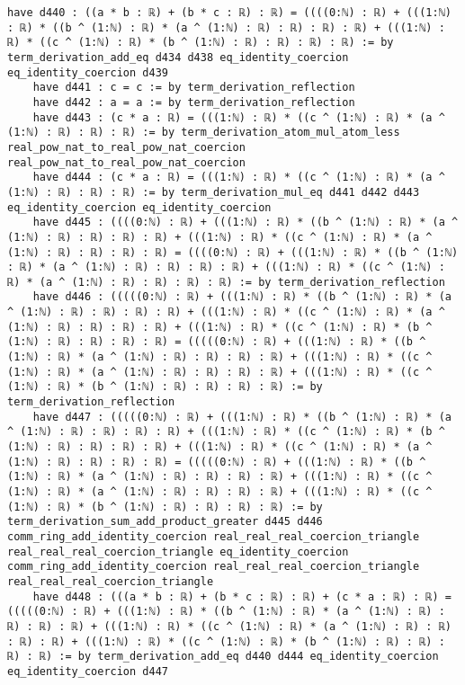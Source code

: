 \documentclass{article}
\begin{document}
\begin{tcolorbox}[colback=white!10, width=\linewidth]
\begin{lstlisting}[language=Lean4]
    have d440 : ((a * b : ℝ) + (b * c : ℝ) : ℝ) = ((((0:ℕ) : ℝ) + (((1:ℕ) : ℝ) * ((b ^ (1:ℕ) : ℝ) * (a ^ (1:ℕ) : ℝ) : ℝ) : ℝ) : ℝ) + (((1:ℕ) : ℝ) * ((c ^ (1:ℕ) : ℝ) * (b ^ (1:ℕ) : ℝ) : ℝ) : ℝ) : ℝ) := by term_derivation_add_eq d434 d438 eq_identity_coercion eq_identity_coercion d439
    have d441 : c = c := by term_derivation_reflection
    have d442 : a = a := by term_derivation_reflection
    have d443 : (c * a : ℝ) = (((1:ℕ) : ℝ) * ((c ^ (1:ℕ) : ℝ) * (a ^ (1:ℕ) : ℝ) : ℝ) : ℝ) := by term_derivation_atom_mul_atom_less real_pow_nat_to_real_pow_nat_coercion real_pow_nat_to_real_pow_nat_coercion
    have d444 : (c * a : ℝ) = (((1:ℕ) : ℝ) * ((c ^ (1:ℕ) : ℝ) * (a ^ (1:ℕ) : ℝ) : ℝ) : ℝ) := by term_derivation_mul_eq d441 d442 d443 eq_identity_coercion eq_identity_coercion
    have d445 : ((((0:ℕ) : ℝ) + (((1:ℕ) : ℝ) * ((b ^ (1:ℕ) : ℝ) * (a ^ (1:ℕ) : ℝ) : ℝ) : ℝ) : ℝ) + (((1:ℕ) : ℝ) * ((c ^ (1:ℕ) : ℝ) * (a ^ (1:ℕ) : ℝ) : ℝ) : ℝ) : ℝ) = ((((0:ℕ) : ℝ) + (((1:ℕ) : ℝ) * ((b ^ (1:ℕ) : ℝ) * (a ^ (1:ℕ) : ℝ) : ℝ) : ℝ) : ℝ) + (((1:ℕ) : ℝ) * ((c ^ (1:ℕ) : ℝ) * (a ^ (1:ℕ) : ℝ) : ℝ) : ℝ) : ℝ) := by term_derivation_reflection
    have d446 : (((((0:ℕ) : ℝ) + (((1:ℕ) : ℝ) * ((b ^ (1:ℕ) : ℝ) * (a ^ (1:ℕ) : ℝ) : ℝ) : ℝ) : ℝ) + (((1:ℕ) : ℝ) * ((c ^ (1:ℕ) : ℝ) * (a ^ (1:ℕ) : ℝ) : ℝ) : ℝ) : ℝ) + (((1:ℕ) : ℝ) * ((c ^ (1:ℕ) : ℝ) * (b ^ (1:ℕ) : ℝ) : ℝ) : ℝ) : ℝ) = (((((0:ℕ) : ℝ) + (((1:ℕ) : ℝ) * ((b ^ (1:ℕ) : ℝ) * (a ^ (1:ℕ) : ℝ) : ℝ) : ℝ) : ℝ) + (((1:ℕ) : ℝ) * ((c ^ (1:ℕ) : ℝ) * (a ^ (1:ℕ) : ℝ) : ℝ) : ℝ) : ℝ) + (((1:ℕ) : ℝ) * ((c ^ (1:ℕ) : ℝ) * (b ^ (1:ℕ) : ℝ) : ℝ) : ℝ) : ℝ) := by term_derivation_reflection
    have d447 : (((((0:ℕ) : ℝ) + (((1:ℕ) : ℝ) * ((b ^ (1:ℕ) : ℝ) * (a ^ (1:ℕ) : ℝ) : ℝ) : ℝ) : ℝ) + (((1:ℕ) : ℝ) * ((c ^ (1:ℕ) : ℝ) * (b ^ (1:ℕ) : ℝ) : ℝ) : ℝ) : ℝ) + (((1:ℕ) : ℝ) * ((c ^ (1:ℕ) : ℝ) * (a ^ (1:ℕ) : ℝ) : ℝ) : ℝ) : ℝ) = (((((0:ℕ) : ℝ) + (((1:ℕ) : ℝ) * ((b ^ (1:ℕ) : ℝ) * (a ^ (1:ℕ) : ℝ) : ℝ) : ℝ) : ℝ) + (((1:ℕ) : ℝ) * ((c ^ (1:ℕ) : ℝ) * (a ^ (1:ℕ) : ℝ) : ℝ) : ℝ) : ℝ) + (((1:ℕ) : ℝ) * ((c ^ (1:ℕ) : ℝ) * (b ^ (1:ℕ) : ℝ) : ℝ) : ℝ) : ℝ) := by term_derivation_sum_add_product_greater d445 d446 comm_ring_add_identity_coercion real_real_real_coercion_triangle real_real_real_coercion_triangle eq_identity_coercion comm_ring_add_identity_coercion real_real_real_coercion_triangle real_real_real_coercion_triangle
    have d448 : (((a * b : ℝ) + (b * c : ℝ) : ℝ) + (c * a : ℝ) : ℝ) = (((((0:ℕ) : ℝ) + (((1:ℕ) : ℝ) * ((b ^ (1:ℕ) : ℝ) * (a ^ (1:ℕ) : ℝ) : ℝ) : ℝ) : ℝ) + (((1:ℕ) : ℝ) * ((c ^ (1:ℕ) : ℝ) * (a ^ (1:ℕ) : ℝ) : ℝ) : ℝ) : ℝ) + (((1:ℕ) : ℝ) * ((c ^ (1:ℕ) : ℝ) * (b ^ (1:ℕ) : ℝ) : ℝ) : ℝ) : ℝ) := by term_derivation_add_eq d440 d444 eq_identity_coercion eq_identity_coercion d447

\end{lstlisting}
\end{tcolorbox}
\end{document}
